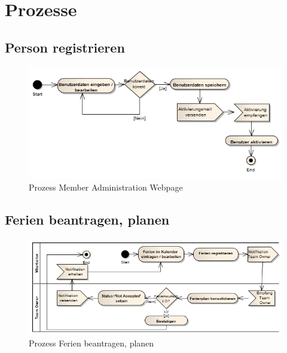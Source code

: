 \section{Prozesse}\label{konzept:prozesse}
\subsection{Person registrieren}
 \begin{figure}[H]
  	\centering
    	\includegraphics[width=15cm]{images/process_registration}
 	\caption{Prozess Member Administration Webpage}
\end{figure}

\subsection{Ferien beantragen, planen}
 \begin{figure}[H]
  	\centering
    	\includegraphics[width=15cm]{images/process_vacation}
 	\caption{Prozess Ferien beantragen, planen}
\end{figure}


